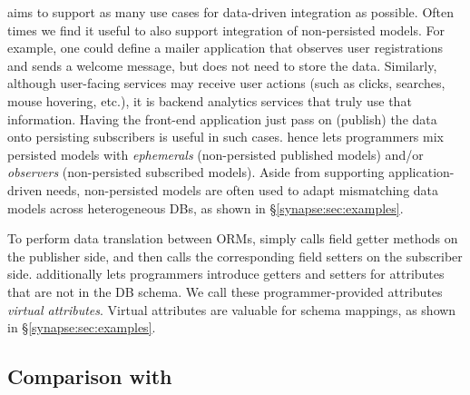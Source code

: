  \synapse aims to support as many use cases
for data-driven integration as possible.  Often times we find it useful to
also support integration of non-persisted models.
For example, one could define a mailer application that observes user
registrations and sends a welcome message, but does not need to store the data.
Similarly, although user-facing services may receive user actions
(such as clicks, searches, mouse hovering, etc.), it is backend analytics
services that truly use that information.  Having the front-end application just
pass on (publish) the data onto persisting subscribers is useful in such cases.
\synapse hence lets programmers mix persisted models with {\em ephemerals}
(non-persisted published models)
and/or {\em observers} (non-persisted subscribed models).  Aside from
supporting application-driven needs, non-persisted models are often used to
adapt mismatching data models across heterogeneous DBs, as shown in
\S\ref{synapse:sec:examples}.

 To perform data translation between ORMs,
\synapse simply calls field getter methods on the publisher side, and then
calls the corresponding field setters on the subscriber side. \synapse
additionally lets programmers introduce getters and setters for attributes
that are not in the DB schema.  We call these programmer-provided attributes
{\em virtual attributes}. Virtual attributes are valuable for schema mappings,
as shown in \S\ref{synapse:sec:examples}.

\subsection{Comparison with \scribe}
\label{synapse:sec:record-replay}

